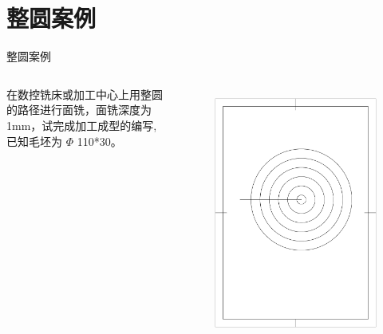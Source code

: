 \documentclass[UTF8,zihao=-4]{ctexbeamer}
\begin{document}
\section{整圆案例}
\begin{frame}{整圆案例}
    \begin{columns}
        在数控铣床或加工中心上用整圆的路径进行面铣，面铣深度为1mm，试完成加工成型的编写,已知毛坯为 $\Phi$ 110*30。
        
        \begin{figure}
            \centering
            \includegraphics[width=0.8\linewidth,trim=50 150 50 100,clip]{image/5-3.jpg}
            \label{fig:5-3}
        \end{figure}
    \end{columns}
\end{frame}
\end{document}
